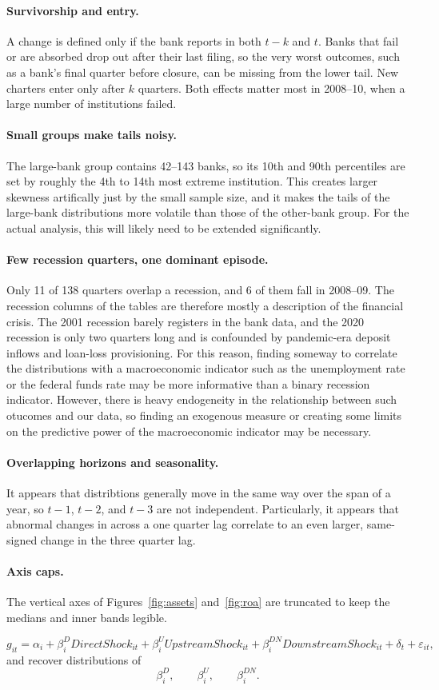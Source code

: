 \documentclass[11pt]{article}
\begin{document}
\paragraph{Survivorship and entry.}
A change is defined only if the bank reports in both $t-k$ and $t$. Banks that fail or are absorbed drop out after their last filing, so the very worst outcomes, such as a bank's final quarter before closure, can be missing from the lower tail. New charters enter only after $k$ quarters. Both effects matter most in 2008--10, when a large number of institutions failed.

\paragraph{Small groups make tails noisy.}
The large-bank group contains 42--143 banks, so its 10th and 90th percentiles are set by roughly the 4th to 14th most extreme institution. This creates larger skewness artifically just by the small sample size, and it makes the tails of the large-bank distributions more volatile than those of the other-bank group. For the actual analysis, this will likely need to be extended significantly.

\paragraph{Few recession quarters, one dominant episode.}
Only 11 of 138 quarters overlap a recession, and 6 of them fall in 2008--09. The recession columns of the tables are therefore mostly a description of the financial crisis. The 2001 recession barely registers in the bank data, and the 2020 recession is only two quarters long and is confounded by pandemic-era deposit inflows and loan-loss provisioning. For this reason, finding someway to correlate the distributions with a macroeconomic indicator such as the unemployment rate or the federal funds rate may be more informative than a binary recession indicator. However, there is heavy endogeneity in the relationship between such otucomes and our data, so finding an exogenous measure or creating some limits on the predictive power of the macroeconomic indicator may be necessary.

\paragraph{Overlapping horizons and seasonality.}
It appears that distribtions generally move in the same way over the span of a year, so $t-1$, $t-2$, and $t-3$ are not independent. Particularly, it appears that abnormal changes in across a one quarter lag correlate to an even larger, same-signed change in the three quarter lag. 

\paragraph{Axis caps.}
The vertical axes of Figures~\ref{fig:assets} and~\ref{fig:roa} are truncated to keep the medians and inner bands legible.

\[ g_{it} = \alpha_i+ \beta^D_i DirectShock_{it} +\beta^U_i UpstreamShock_{it} +\beta^{DN}_i DownstreamShock_{it} +\delta_t+\varepsilon_{it}, \]
and recover distributions of
\[ \beta^D_i,\qquad\beta^U_i,\qquad\beta^{DN}_i. \]
\end{document}
